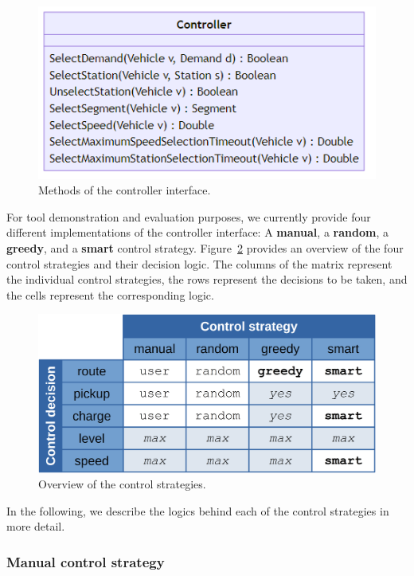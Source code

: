 \documentclass[10pt,twocolumn]{article}
\begin{document}
\begin{figure}[!ht]
    \centering
    \includegraphics[scale=0.4]{../../diagrams/controller/classes-minimal.png}
    \caption{Methods of the controller interface.}
    \label{fig:controller-interface}
\end{figure}

For tool demonstration and evaluation purposes, we currently provide four different implementations of the controller interface: A \textbf{manual}, a \textbf{random}, a \textbf{greedy}, and a \textbf{smart} control strategy.
Figure~\ref{fig:control-strategies} provides an overview of the four control strategies and their decision logic.
The columns of the matrix represent the individual control strategies, the rows represent the decisions to be taken, and the cells represent the corresponding logic.

\begin{figure}[!ht]
    \centering
    \includegraphics[width=0.8\columnwidth]{control_strategy_overview.png}
    \caption{Overview of the control strategies.}
    \label{fig:control-strategies}
\end{figure}

In the following, we describe the logics behind each of the control strategies in more detail.

\subsubsection*{Manual control strategy}
\label{sec:controller-manual}
\end{document}
